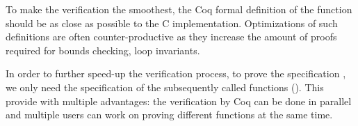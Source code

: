 To make the verification the smoothest, the Coq formal definition of the function
should be as close as possible to the C implementation.
Optimizations of such definitions are often counter-productive as they increase the
amount of proofs required for \eg bounds checking, loop invariants.

In order to further speed-up the verification process, to prove the specification
, we only need the specification of the subsequently
called functions (\eg {}).
This provide with multiple advantages: the verification by Coq can be
done in parallel and multiple users can work on proving different functions at
the same time.


%
%
%
%


